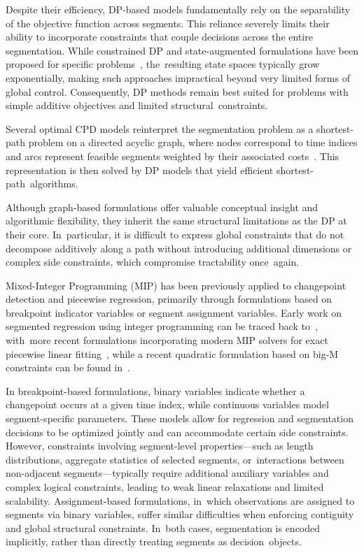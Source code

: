 \documentclass[mathematics,article,accept,pdftex,moreauthors]{Definitions/mdpi}
\begin{document}
Despite their efficiency, DP-based models fundamentally rely on the separability of the objective function across segments. This reliance severely limits their ability to incorporate constraints that couple decisions across the entire segmentation. While constrained DP and state-augmented formulations have been proposed for specific problems~\cite{HRFB13}, the~resulting state spaces typically grow exponentially, making such approaches impractical beyond very limited forms of global control. Consequently, DP methods remain best suited for problems with simple additive objectives and limited structural~constraints.

Several optimal CPD models reinterpret the segmentation problem as a shortest-path problem on a directed acyclic graph, where nodes correspond to time indices and arcs represent feasible segments weighted by their associated costs~\cite{B61,PC75}. This representation is then solved by DP models that yield efficient shortest-path~algorithms.

Although graph-based formulations offer valuable conceptual insight and algorithmic flexibility, they inherit the same structural limitations as the DP at their core. In~particular, it is difficult to express global constraints that do not decompose additively along a path without introducing additional dimensions or complex side constraints, which compromise tractability once~again.

Mixed-Integer Programming (MIP) has been previously applied to changepoint detection and piecewise regression, primarily through formulations based on breakpoint indicator variables or segment assignment variables. Early work on segmented regression using integer programming can be traced back to~\cite{H66,F58}, with~more recent formulations incorporating modern MIP solvers for exact piecewise linear fitting~\cite{BKM16}, while a recent quadratic formulation based on big-M constraints can be found in~\cite{PRSS25}.

In breakpoint-based formulations, binary variables indicate whether a changepoint occurs at a given time index, while continuous variables model segment-specific parameters. These models allow for regression and segmentation decisions to be optimized jointly and can accommodate certain side constraints. However, constraints involving segment-level properties—such as length distributions, aggregate statistics of selected segments, or~interactions between non-adjacent segments—typically require additional auxiliary variables and complex logical constraints, leading to weak linear relaxations and limited scalability.
Assignment-based formulations, in~which observations are assigned to segments via binary variables, suffer similar difficulties when enforcing contiguity and global structural constraints. In~both cases, segmentation is encoded implicitly, rather than directly treating segments as decision~objects.
\end{document}
